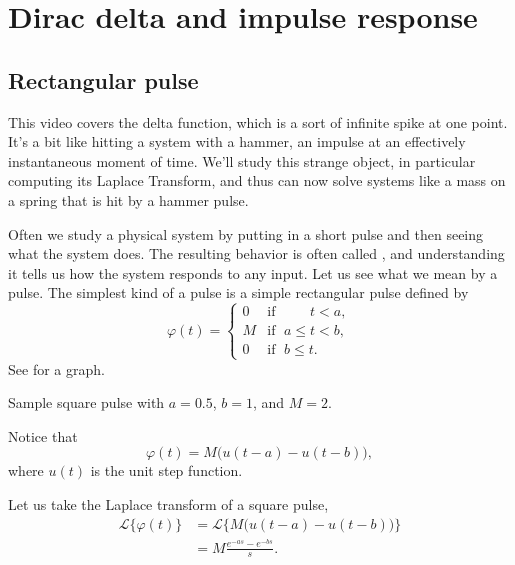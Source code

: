 \sectionnewpage
\section{Dirac delta and impulse response}
\label{diracdelta:section}


\subsection{Rectangular pulse}

\begin{video}
	This video covers the delta function, which is a sort of infinite spike at one point. It's a bit like hitting a system with a hammer, an impulse at an effectively instantaneous moment of time. We'll study this strange object, in particular computing its Laplace Transform, and thus can now solve systems like a mass on a spring that is hit by a hammer pulse. 
\end{video}



Often we study a physical system by putting in a short pulse 
and then seeing what the system does.
The resulting behavior is
often called \emph{},
and understanding it tells us how the system responds to any input.
Let us see what we mean by a pulse.
The simplest kind of a pulse is a simple rectangular pulse defined by
\begin{equation*}
\varphi(t) = 
\begin{cases}
0 & \text{if } \; \phantom{a \leq {}} t < a , \\
M & \text{if } \; a \leq t < b , \\
0 & \text{if } \; b \leq t .
\end{cases}
\end{equation*}
See  for a graph.

\begin{mywrapfig}[15]{3.25in}
\capstart
{}
\caption{Sample square pulse with $a=0.5$, $b=1$, and $M = 2$.\label{lt:sqpulse}}
\end{mywrapfig}

Notice that
\begin{equation*}
\varphi(t) = M \bigl( u(t-a) - u(t-b) \bigr) ,
\end{equation*}
where $u(t)$ is the unit step function.

Let us take the Laplace transform of a square pulse,
\begin{equation*}
\begin{split}
{\mathcal{L}} \bigl\{ \varphi(t) \bigr\}
& =
{\mathcal{L}} \bigl\{ M \bigl( u(t-a) - u(t-b) \bigr)  \bigr\}
\\
& =
M
\frac{e^{-as} - e^{-bs}}{s} .
\end{split}
\end{equation*}

